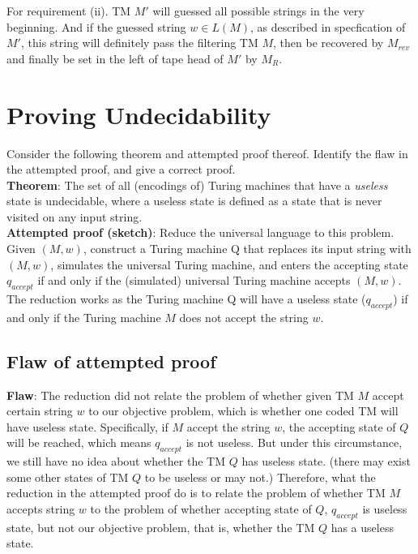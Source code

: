 \documentclass[11pt,a4paper]{article}
\newcommand{\htab}{\hspace*{0.63cm}}
\begin{document}
\htab For requirement (ii). TM $M'$ will guessed all possible strings in the very beginning. And if the guessed 
string $w \in L(M)$, as described in specfication of $M'$, this string will definitely pass the filtering TM $M$, 
then be recovered by $M_{rev}$ and finally be set in the left of tape head of $M'$ by $M_{R}$. \\
\newpage
\section{Proving Undecidability}
Consider the following theorem and attempted proof thereof. Identify the flaw in the attempted proof, and give a correct proof. \\
\textbf{Theorem}: The set of all (encodings of) Turing machines that have a \textit{useless} state 
is undecidable, where a useless state is defined as a state that is never visited on any input string. \\
\textbf{Attempted proof (sketch)}: Reduce the universal language to this problem. Given $(M, w)$,
construct a Turing machine Q that replaces its input string with $(M, w)$, simulates the universal
Turing machine, and enters the accepting state $q_{accept}$ if and only if the (simulated) universal
Turing machine accepts $(M, w)$. The reduction works as the Turing machine Q will have a useless
state ($q_{accept}$) if and only if the Turing machine $M$ does not accept the string $w$. 
\subsection{Flaw of attempted proof}
\textbf{Flaw}: The reduction did not relate the problem of whether given TM $M$ accept certain 
string $w$ to our objective problem, which is whether one coded TM will have useless state. Specifically,
if $M$ accept the string $w$, the accepting state of $Q$ will be reached, which means $q_{accept}$ is not
 useless. But under this circumstance, we still have no idea about whether the TM $Q$ has useless state.
 (there may exist some other states of TM $Q$ to be useless or may not.) Therefore, what 
 the reduction in the attempted proof do is to relate the problem of whether TM $M$ accepts string
 $w$ to the problem of whether accepting state of $Q$, $q_{accept}$ is useless state, but not our 
 objective problem, that is, whether the TM $Q$ has a useless state. 
\end{document}
